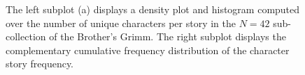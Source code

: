 \begin{figure}[t]
\centering
{}
\caption{The left subplot (a) displays a density plot and histogram computed over the number of unique characters per story in the $N=42$ sub-collection of the Brother's Grimm. The right subplot displays the complementary cumulative frequency distribution of the character story frequency.}
\label{fig:grimm-character-statistics}
\end{figure} 


